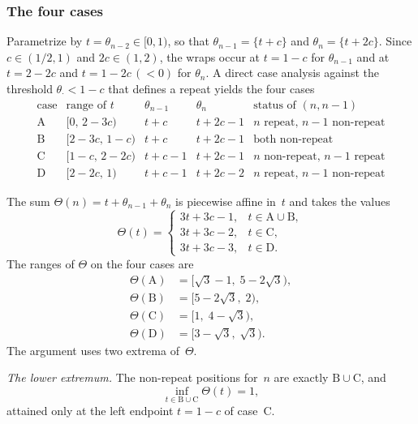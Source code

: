 \documentclass{birkjour}
\theoremstyle{definition}
\theoremstyle{remark}
\newcommand{\frc}[1]{\{ #1 \}}
\begin{document}
\subsubsection*{The four cases}

Parametrize by $t=\theta_{n-2}\in[0,1)$, so that
$\theta_{n-1}=\frc{t+c}$ and
$\theta_{n}=\frc{t+2c}$. Since $c\in(1/2,1)$ and
$2c\in(1,2)$, the wraps occur at
$t=1-c$ for $\theta_{n-1}$ and at $t=2-2c$ and
$t=1-2c\,(<0)$ for $\theta_{n}$. A direct case
analysis against the threshold
$\theta_{\cdot}<1-c$ that defines a repeat yields
the four cases
\[
\begin{array}{l|l|l|l|l}
  \text{case} & \text{range of }t & \theta_{n-1} & \theta_{n} & \text{status of }(n,n-1) \\
  \hline
  \text{A} & [0,\,2{-}3c) & t+c & t+2c-1 & \text{$n$ repeat, $n-1$ non-repeat}\\
  \text{B} & [2{-}3c,\,1{-}c) & t+c & t+2c-1 & \text{both non-repeat}\\
  \text{C} & [1{-}c,\,2{-}2c) & t+c-1 & t+2c-1 & \text{$n$ non-repeat, $n-1$ repeat}\\
  \text{D} & [2{-}2c,\,1) & t+c-1 & t+2c-2 & \text{$n$ repeat, $n-1$ non-repeat}
\end{array}
\]

The sum $\Theta(n)=t+\theta_{n-1}+\theta_{n}$ is
piecewise affine in~$t$ and takes the values
\begin{equation}\label{eq:Theta_cases}
  \Theta(t)=\begin{cases}
    3t+3c-1,&t\in\mathrm{A}\cup\mathrm{B},\\[2pt]
    3t+3c-2,&t\in\mathrm{C},\\[2pt]
    3t+3c-3,&t\in\mathrm{D}.
  \end{cases}
\end{equation}
The ranges of $\Theta$ on the four cases are
\begin{equation}\label{eq:Theta_ranges}
\begin{aligned}
  \Theta(\mathrm{A}) &=[\sqrt{3}-1,\;5-2\sqrt{3}),\\
  \Theta(\mathrm{B}) &=[5-2\sqrt{3},\;2),\\
  \Theta(\mathrm{C}) &=[1,\;4-\sqrt{3}),\\
  \Theta(\mathrm{D}) &=[3-\sqrt{3},\;\sqrt{3}).
\end{aligned}
\end{equation}
The argument uses two extrema of~$\Theta$.

\emph{The lower extremum.} The non-repeat
positions for~$n$ are exactly $\mathrm{B}\cup\mathrm{C}$, and
\begin{equation}\label{eq:lower_extremum}
  \inf_{t\in\mathrm{B}\cup\mathrm{C}}\Theta(t)=1,
\end{equation}
attained only at the left endpoint $t=1-c$ of
case~C.
\end{document}
